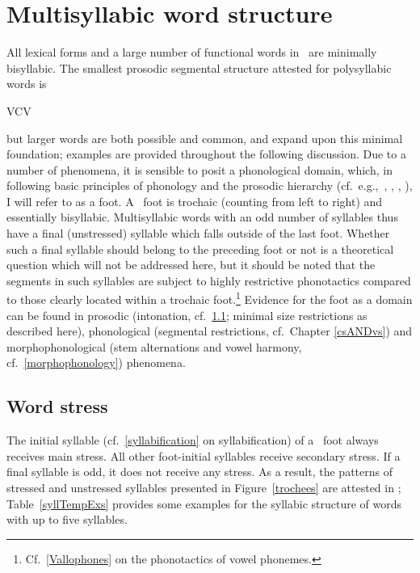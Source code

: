 \section{Multisyllabic word structure}\label{polysyllabicWords}
All lexical forms and a large number of functional words in \PS\ are minimally bisyllabic. The smallest prosodic segmental structure attested for polysyllabic words is \begin{center}VCV\end{center} but larger words are both possible and common, and expand upon this minimal foundation; examples are provided throughout the following discussion. Due to a number of phenomena, it is sensible to posit a phonological domain, which, in following basic principles of phonology %
and the prosodic hierarchy %
(cf.~e.g.,~\citealt[280--283]{dixon2010a}, \citealt{Selkirk1980}, \citealt{Hayes1989}, \citealt{NesporVogel1986}), I will refer to as a {foot}. A \PS\ foot is trochaic (counting from left to right) and essentially bisyllabic. Multisyllabic words with an odd number of syllables thus have a final (unstressed) syllable which falls outside of the last foot. \enlargethispage{\baselineskip}
Whether such a final syllable should belong to the preceding foot or not is a theoretical question which will not be addressed here, but it should be noted that the segments in such syllables are subject to highly restrictive phonotactics compared to those clearly located within a trochaic foot.\footnote{Cf.~\SEC\ref{Vallophones} on the phonotactics of vowel phonemes.} 
Evidence for the foot as a domain can be found in prosodic (intonation, cf.~\SEC\ref{wordStress}; minimal size restrictions as described here), phonological (segmental restrictions, cf.~Chapter \ref{csANDvs}) and morphophonological (stem alternations and vowel harmony, cf.~\SEC\ref{morphophonology}) phenomena. 




\subsection{Word stress}\label{wordStress}
The initial syllable (cf.~\SEC\ref{syllabification} on syllabification) of a \PS\ foot always receives main stress. All other foot-initial syllables receive secondary stress. If a final syllable is odd, it does not receive any stress. As a result, the patterns of stressed and unstressed syllables presented in Figure~\vref{trochees} are attested in \PS; 
Table~\vref{syllTempExs} provides some examples for the syllabic structure of words with up to five syllables. 

